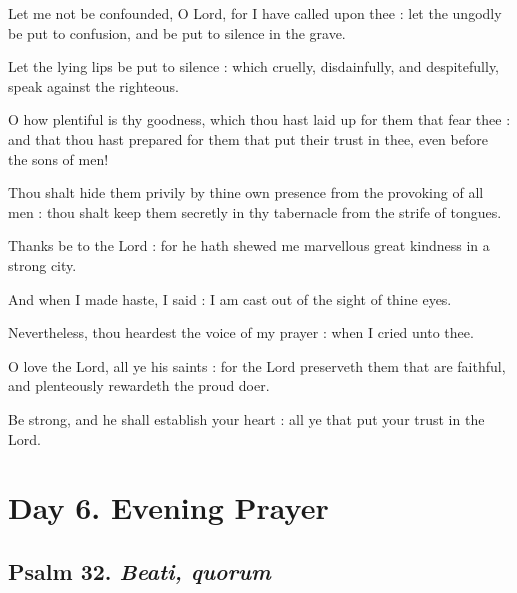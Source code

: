 Let me not be confounded, O Lord, for I have called upon thee : let the ungodly be put to confusion, and be put to silence in the grave.\par
{}Let the lying lips be put to silence : which cruelly, disdainfully, and despitefully, speak against the righteous.\par
{}O how plentiful is thy goodness, which thou hast laid up for them that fear thee : and that thou hast prepared for them that put their trust in thee, even before the sons of men!\par
{}Thou shalt hide them privily by thine own presence from the provoking of all men : thou shalt keep them secretly in thy tabernacle from the strife of tongues.\par
{}Thanks be to the Lord : for he hath shewed me marvellous great kindness in a strong city.\par
{}And when I made haste, I said : I am cast out of the sight of thine eyes.\par
{}Nevertheless, thou heardest the voice of my prayer : when I cried unto thee.\par
{}O love the Lord, all ye his saints : for the Lord preserveth them that are faithful, and plenteously rewardeth the proud doer.\par
{}Be strong, and he shall establish your heart : all ye that put your trust in the Lord.\par

\section*{Day 6. Evening Prayer}

\subsection{Psalm 32. \textit{Beati, quorum}}

